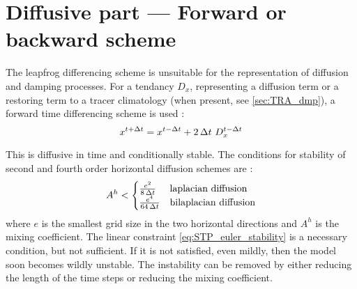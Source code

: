 \documentclass[../main/NEMO_manual]{subfiles}
\begin{document}
\section{Diffusive part --- Forward or backward scheme}
\label{sec:STP_forward_imp}

The leapfrog differencing scheme is unsuitable for the representation of diffusion and damping processes.
For a tendancy $D_x$, representing a diffusion term or a restoring term to a tracer climatology
(when present, see \autoref{sec:TRA_dmp}), a forward time differencing scheme is used :
\[
  x^{t + \Delta t} = x^{t - \Delta t} + 2 \, \Delta t \ D_x^{t - \Delta t}
\]

This is diffusive in time and conditionally stable.
The conditions for stability of second and fourth order horizontal diffusion schemes are \citep{Griffies_Bk04}:
\begin{equation}
  \label{eq:STP_euler_stability}
  A^h <
  \begin{cases}
    \frac{e^2}{ 8 \, \Delta t} & \text{laplacian diffusion} \\
    \frac{e^4}{64 \, \Delta t} & \text{bilaplacian diffusion}
  \end{cases}
\end{equation}
where $e$ is the smallest grid size in the two horizontal directions and $A^h$ is the mixing coefficient.
The linear constraint \autoref{eq:STP_euler_stability} is a necessary condition, but not sufficient.
If it is not satisfied, even mildly, then the model soon becomes wildly unstable.
The instability can be removed by either reducing the length of the time steps or reducing the mixing coefficient.
\end{document}
